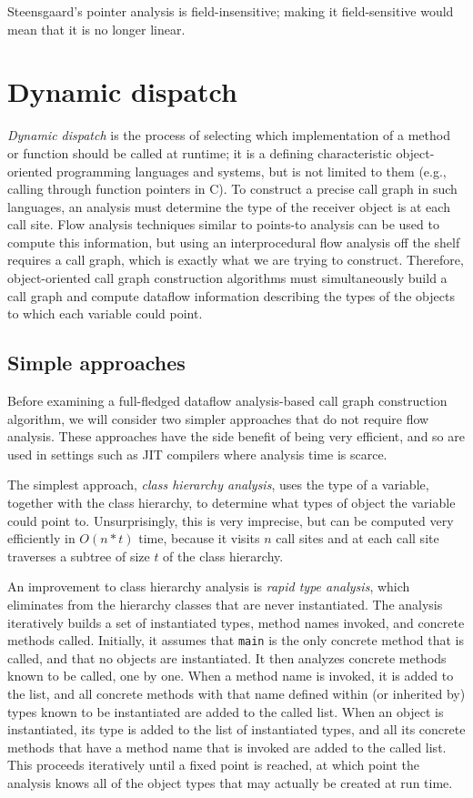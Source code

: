 \documentclass[11pt]{article}
\begin{document}
Steensgaard's pointer analysis is field-insensitive; making it field-sensitive would mean that it is no longer linear.

\section{Dynamic dispatch}

\emph{Dynamic dispatch} is the process of selecting which implementation of a
method or function should be called at runtime; it is a defining characteristic
object-oriented programming languages and systems, but is not limited to them
(e.g., calling through function pointers in C). To construct a precise call
graph in such languages, an analysis must determine the type of the receiver
object is at each call site. Flow analysis techniques similar to points-to
analysis can be used to compute this information, but using an interprocedural
flow analysis off the shelf requires a call graph, which is exactly what we are
trying to construct. Therefore, object-oriented call graph construction
algorithms must simultaneously build a call graph and compute dataflow
information describing the types of the objects to which each variable could
point.

\subsection{Simple approaches}

Before examining a full-fledged dataflow analysis-based call graph construction
algorithm, we will consider two simpler approaches that do not require flow
analysis. These approaches have the side benefit of being very efficient, and so
are used in settings such as JIT compilers where analysis time is scarce.

The simplest approach, \emph{class hierarchy analysis}, uses the type of a
variable, together with the class hierarchy, to determine what types of object
the variable could point to. Unsurprisingly, this is very imprecise, but can be
computed very efficiently in $O(n*t)$ time, because it visits $n$ call sites and
at each call site traverses a subtree of size $t$ of the class hierarchy.

An improvement to class hierarchy analysis is \textit{rapid type analysis},
which eliminates from the hierarchy classes that are never instantiated. The
analysis iteratively builds a set of instantiated types, method names invoked,
and concrete methods called. Initially, it assumes that \texttt{main} is the
only concrete method that is called, and that no objects are instantiated. It
then analyzes concrete methods known to be called, one by one. When a method name
is invoked, it is added to the list, and all concrete methods with that name
defined within (or inherited by) types known to be instantiated are added to the
called list. When an object is instantiated, its type is added to the list of
instantiated types, and all its concrete methods that have a method name that is
invoked are added to the called list. This proceeds iteratively until a fixed
point is reached, at which point the analysis knows all of the object types that
may actually be created at run time.
\end{document}
